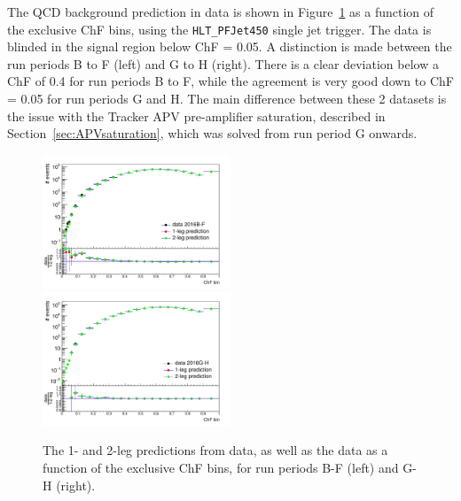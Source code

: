 The \ac{QCD} background prediction in data is shown in Figure~\ref{fig:prediction} as a function of the exclusive ChF bins, using the \texttt{HLT\_PFJet450} single jet trigger. The data is blinded in the signal region below ChF = 0.05. A distinction is made between the run periods B to F (left) and G to H (right). There is a clear deviation below a ChF of 0.4 for run periods B to F, while the agreement is very good down to ChF = 0.05 for run periods G and H. The main difference between these 2 datasets is the issue with the Tracker APV pre-amplifier saturation, described in Section~\ref{sec:APVsaturation}, which was solved from run period G onwards.

\begin{figure}[ht]
  \centering
  \includegraphics[width=0.5\textwidth]{figures/data_vs_prediction_BF_unblinded.pdf}\hfill%
  \includegraphics[width=0.5\textwidth]{figures/data_vs_prediction_GH_filters.pdf}
  \caption{The 1- and 2-leg predictions from data, as well as the data as a function of the exclusive ChF bins, for run periods B-F (left) and G-H (right).}
  \label{fig:prediction}
\end{figure}

